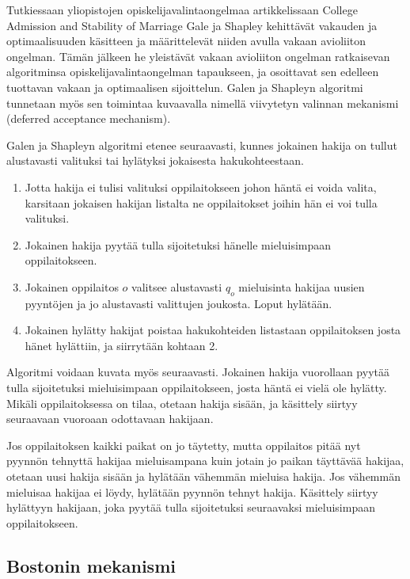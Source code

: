 \documentclass[twoside]{tktltiki}
\begin{document}
Tutkiessaan yliopistojen opiskelijavalintaongelmaa artikkelissaan
College Admission and Stability of Marriage \cite{galeshapley62} Gale
ja Shapley kehittävät vakauden ja optimaalisuuden käsitteen ja
määrittelevät niiden avulla vakaan avioliiton ongelman. Tämän jälkeen
he yleistävät vakaan avioliiton ongelman ratkaisevan algoritminsa
opiskelijavalintaongelman tapaukseen, ja osoittavat sen edelleen
tuottavan vakaan ja optimaalisen sijoittelun. Galen ja Shapleyn
algoritmi tunnetaan myös sen toimintaa kuvaavalla nimellä viivytetyn
valinnan mekanismi (deferred acceptance mechanism).

Galen ja Shapleyn algoritmi etenee seuraavasti, kunnes jokainen hakija
on tullut alustavasti valituksi tai hylätyksi jokaisesta
hakukohteestaan.

\begin{enumerate}
\item Jotta hakija ei tulisi valituksi oppilaitokseen johon häntä ei
  voida valita, karsitaan jokaisen hakijan listalta ne oppilaitokset
  joihin hän ei voi tulla valituksi.

\item Jokainen hakija pyytää tulla sijoitetuksi hänelle mieluisimpaan
  oppilaitokseen.

\item Jokainen oppilaitos $o$ valitsee alustavasti $q_o$ mieluisinta
  hakijaa uusien pyyntöjen ja jo alustavasti valittujen joukosta.
  Loput hylätään.

\item Jokainen hylätty hakijat poistaa hakukohteiden listastaan
  oppilaitoksen josta hänet hylättiin, ja siirrytään kohtaan 2.
\end{enumerate}

Algoritmi voidaan kuvata myös seuraavasti. Jokainen hakija vuorollaan
pyytää tulla sijoitetuksi mieluisimpaan oppilaitokseen, josta häntä ei
vielä ole hylätty. Mikäli oppilaitoksessa on tilaa, otetaan hakija
sisään, ja käsittely siirtyy seuraavaan vuoroaan odottavaan hakijaan.

Jos oppilaitoksen kaikki paikat on jo täytetty, mutta oppilaitos pitää
nyt pyynnön tehnyttä hakijaa mieluisampana kuin jotain jo paikan
täyttävää hakijaa, otetaan uusi hakija sisään ja hylätään vähemmän
mieluisa hakija. Jos vähemmän mieluisaa hakijaa ei löydy, hylätään
pyynnön tehnyt hakija. Käsittely siirtyy hylättyyn hakijaan, joka
pyytää tulla sijoitetuksi seuraavaksi mieluisimpaan oppilaitokseen.

\subsection{Bostonin mekanismi}
\end{document}
